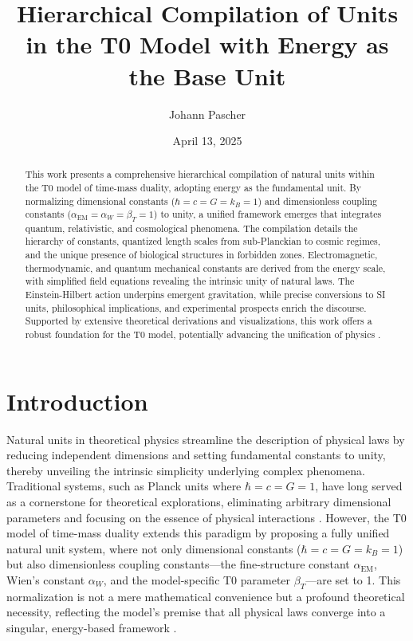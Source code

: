 \documentclass[12pt,a4paper]{article}
\begin{document}
	
	\title{Hierarchical Compilation of Units in the T0 Model with Energy as the Base Unit}
	\author{Johann Pascher}
	\date{April 13, 2025}
	
	\maketitle
	
	\begin{abstract}
		This work presents a comprehensive hierarchical compilation of natural units within the T0 model of time-mass duality, adopting energy as the fundamental unit. By normalizing dimensional constants (\(\hbar = c = G = k_B = 1\)) and dimensionless coupling constants (\(\alpha_{\text{EM}} = \alpha_W = \beta_T = 1\)) to unity, a unified framework emerges that integrates quantum, relativistic, and cosmological phenomena. The compilation details the hierarchy of constants, quantized length scales from sub-Planckian to cosmic regimes, and the unique presence of biological structures in forbidden zones. Electromagnetic, thermodynamic, and quantum mechanical constants are derived from the energy scale, with simplified field equations revealing the intrinsic unity of natural laws. The Einstein-Hilbert action underpins emergent gravitation, while precise conversions to SI units, philosophical implications, and experimental prospects enrich the discourse. Supported by extensive theoretical derivations and visualizations, this work offers a robust foundation for the T0 model, potentially advancing the unification of physics \cite{pascher_alphabeta_2025}.
	\end{abstract}
	
	\tableofcontents
	\newpage
	
	\section{Introduction}
	\label{sec:introduction}
	
	Natural units in theoretical physics streamline the description of physical laws by reducing independent dimensions and setting fundamental constants to unity, thereby unveiling the intrinsic simplicity underlying complex phenomena. Traditional systems, such as Planck units where \(\hbar = c = G = 1\), have long served as a cornerstone for theoretical explorations, eliminating arbitrary dimensional parameters and focusing on the essence of physical interactions \cite{Planck1899}. However, the T0 model of time-mass duality extends this paradigm by proposing a fully unified natural unit system, where not only dimensional constants (\(\hbar = c = G = k_B = 1\)) but also dimensionless coupling constants—the fine-structure constant \(\alpha_{\text{EM}}\), Wien’s constant \(\alpha_W\), and the model-specific T0 parameter \(\beta_T\)—are set to 1. This normalization is not a mere mathematical convenience but a profound theoretical necessity, reflecting the model’s premise that all physical laws converge into a singular, energy-based framework \cite{pascher_zeit_2025}.
	
\end{document}

